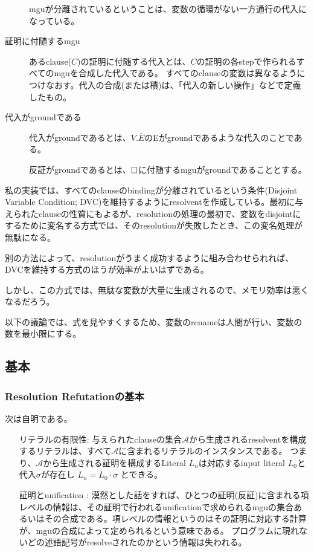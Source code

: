 \documentclass[10pt, onecolumn]{jarticle}   	%
\begin{document}
\begin{description}
mguが分離されているということは、変数の循環がない一方通行の代入になっている。

\item[証明に付随するmgu]
あるclause($C$)の証明に付随する代入とは、$C$の証明の各stepで作られるすべてのmguを合成した代入である。
すべてのclauseの変数は異なるようにつけなおす。代入の合成(または積)は、「代入の新しい操作」などで定義したもの。

\item[代入がgroundである] 
代入がgroundであるとは、$V.\bar E$のEがgroundであるような代入のことである。

反証がgroundであるとは、$\square$に付随するmguがgroundであることとする。

\end{description}

私の実装では、すべてのclauseのbindingが分離されているという条件(Disjoint Variable Condition; DVC)を維持するようにresolventを作成している。最初に与えられたclauseの性質にもよるが、resolutionの処理の最初で、変数をdisjointにするために変名する方式では、そのresolutionが失敗したとき、この変名処理が無駄になる。

別の方法によって、resolutionがうまく成功するように組み合わせられれば、DVCを維持する方式のほうが効率がよいはずである。

しかし、この方式では、無駄な変数が大量に生成されるので、メモリ効率は悪くなるだろう。

以下の議論では、式を見やすくするため、変数のrenameは人間が行い、変数の数を最小限にする。

\subsection{基本}
\subsubsection{Resolution Refutationの基本}
次は自明である。
\begin{itemize}
\item [リテラルの有限性:] 与えられたclauseの集合$\mathcal{A}$から生成されるresolventを構成するリテラルは、すべて$\mathcal{A}$に含まれるリテラルのインスタンスである。
つまり、$\mathcal{A}$から生成される証明を構成するLiteral $L_n$は対応するinput literal $L_0$と代入$\sigma$が存在し
$L_n = L_0 \cdot \sigma$
とできる。

\item [証明とunification :] 漠然とした話をすれば、ひとつの証明(反証)に含まれる項レベルの情報は、その証明で行われるunificationで求められるmguの集合あるいはその合成である。項レベルの情報というのはその証明に対応する計算が、mguの合成によって定められるという意味である。
プログラムに現れないどの述語記号がresolveされたのかという情報は失われる。
\end{itemize}
\end{document}
